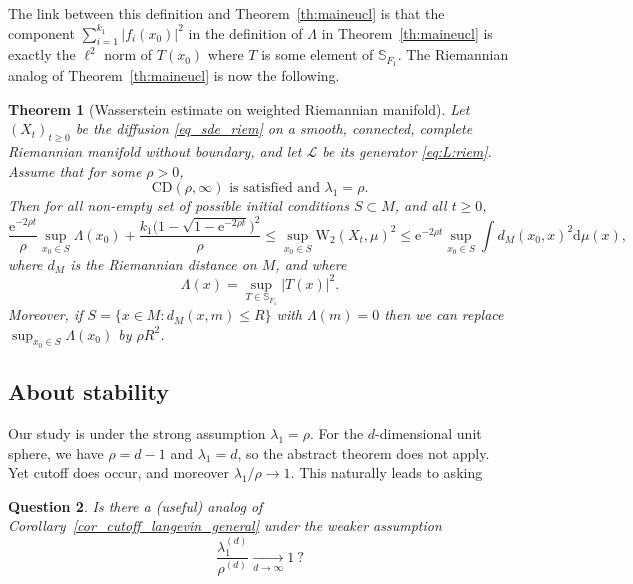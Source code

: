 \documentclass[10pt,reqno]{amsart}
\newtheorem{theorem}{Theorem}[section]
\newtheorem{question}[theorem]{Question}
\numberwithin{equation}{section}
\begin{document}
The link between this definition and Theorem~\ref{th:maineucl} is that the
component $\sum_{i=1}^{k_1}|f_i(x_0)|^2$ in the definition of $\Lambda$ in
Theorem~\ref{th:maineucl} is exactly the $\ell^2$ norm of $T(x_0)$ where $T$
is some element of $\mathbb{S}_{F_1}$. The Riemannian analog of
Theorem~\ref{th:maineucl} is now the following.

\begin{theorem}[Wasserstein estimate on weighted Riemannian manifold]\label{main_thm_riem}
  Let ${(X_t)}_{t\geq0}$ be the diffusion \eqref{eq_sde_riem} on a smooth,
  connected, complete Riemannian manifold without boundary, and let
  $\mathcal{L}$ be its generator \eqref{eq:L:riem}. Assume that for some
  $\rho>0$,
  \begin{equation}
   \text{$\mathrm{CD}(\rho, \infty)$ is satisfied and $\lambda_1 = \rho$}.
  \end{equation}
  Then for all non-empty set of possible initial conditions $S\subset M$, and all $t\geq0$, 
  \begin{equation} 
    \frac{\mathrm{e}^{-2\rho t}}{\rho}\sup_{x_0 \in S}\Lambda(x_0) %
     +\frac{k_1\bigl(1-\sqrt{1-\mathrm{e}^{-2\rho t}}\bigr)^2}{\rho} %
    \leq \sup_{x_0\in S}\mathrm{W}_2(X_t, \mu)^2 %
    \leq \mathrm{e}^{-2\rho t} \sup_{x_0 \in S}\int d_M(x_0, x)^2\mathrm{d}\mu(x),
  \end{equation}
  where $d_M$ is the Riemannian distance on $M$, and where
  \begin{equation}
    \Lambda(x)=\sup_{T\in\mathbb{S}_{F_1}}|T(x)|^2.
  \end{equation}
  Moreover, if $S=\{x\in M:d_M(x,m)\leq R\}$ with $\Lambda(m)=0$ then we can
  replace $\sup_{x_0\in S}\Lambda(x_0)$ by $\rho R^2$.
\end{theorem}

\subsection{About stability}

Our study is under the strong assumption $\lambda_1 = \rho$. For the
$d$-dimensional unit sphere, we have $\rho = d-1$ and $\lambda_1 = d$, so the
abstract theorem does not apply. Yet cutoff does occur, and moreover
$\lambda_1/\rho \longrightarrow 1$. This naturally leads to asking

\begin{question}
  Is there a (useful) analog of Corollary~\ref{cor_cutoff_langevin_general}
  under the weaker assumption
  \begin{equation}
    \frac{\lambda_1^{(d)}}{\rho^{(d)}} 
    \xrightarrow[d\to\infty]{}1\ ?
  \end{equation}
\end{question}
\end{document}
